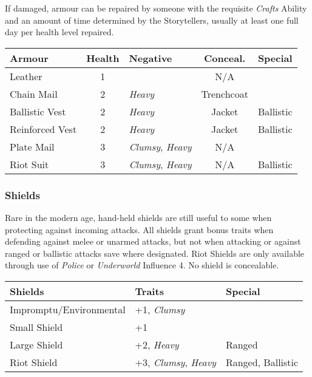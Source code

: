 If damaged, armour can be repaired by someone with the requisite \emph{Crafts} Ability and an 
amount of time determined by the Storytellers, usually at least one full day per health level 
repaired. \\

{\footnotesize
\begin{tabular}{|l c l c l|}
	\hline
	\textbf{Armour} & \textbf{Health} & \textbf{Negative} & \textbf{Conceal.} & \textbf{Special} \\
	\hline
	Leather & 1 & & N/A & \\
	Chain Mail & 2 & \emph{Heavy} & Trenchcoat & \\
	Ballistic Vest & 2 & \emph{Heavy} & Jacket & Ballistic \\
	Reinforced Vest & 2 & \emph{Heavy} & Jacket & Ballistic \\
	Plate Mail & 3 & \emph{Clumsy}, \emph{Heavy} & N/A & \\
	Riot Suit & 3 & \emph{Clumsy}, \emph{Heavy} & N/A & Ballistic \\
	\hline
\end{tabular}
}

\subsubsection{Shields}
Rare in the modern age, hand-held shields are still useful to some when protecting 
against incoming attacks.  All shields grant bonus traits when defending against melee 
or unarmed attacks, but not when attacking or against ranged or ballistic attacks save 
where designated.  Riot Shields are only available through use of \emph{Police} or 
\emph{Underworld} Influence 4.  No shield is concealable.  \\

{\footnotesize
\begin{tabular}{|l l l|}
	\hline
	\textbf{Shields} & \textbf{Traits} & \textbf{Special} \\
	\hline
	Impromptu/Environmental & +1, \emph{Clumsy} & \\
	Small Shield & +1 & \\
	Large Shield & +2, \emph{Heavy} & Ranged \\
	Riot Shield & +3, \emph{Clumsy}, \emph{Heavy} & Ranged, Ballistic \\
	\hline
\end{tabular}
}